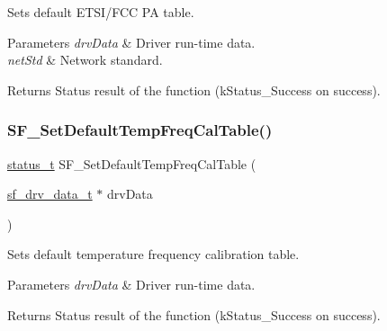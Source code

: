 Sets default E\+T\+S\+I/\+F\+CC PA table. 


\begin{DoxyParams}{Parameters}
{\em drv\+Data} & Driver run-\/time data. \\
\hline
{\em net\+Std} & Network standard.\\
\hline
\end{DoxyParams}
\begin{DoxyReturn}{Returns}
Status result of the function (k\+Status\+\_\+\+Success on success). 
\end{DoxyReturn}
\mbox{\label{group__sf__functions__group_gac8894d84b5416dd2c400507acd3553a1}} 
\subsubsection{\texorpdfstring{SF\_SetDefaultTempFreqCalTable()}{SF\_SetDefaultTempFreqCalTable()}}
{\footnotesize\ttfamily \mbox{\hyperlink{group__ksdk__common_gaaabdaf7ee58ca7269bd4bf24efcde092}{status\+\_\+t}} S\+F\+\_\+\+Set\+Default\+Temp\+Freq\+Cal\+Table (\begin{DoxyParamCaption}\item[{\mbox{\hyperlink{structsf__drv__data__t}{sf\+\_\+drv\+\_\+data\+\_\+t}} $\ast$}]{drv\+Data }\end{DoxyParamCaption})}



Sets default temperature frequency calibration table. 


\begin{DoxyParams}{Parameters}
{\em drv\+Data} & Driver run-\/time data.\\
\hline
\end{DoxyParams}
\begin{DoxyReturn}{Returns}
Status result of the function (k\+Status\+\_\+\+Success on success). 
\end{DoxyReturn}
\mbox{\label{group__sf__functions__group_ga74dd3f84beaf121c2004bb457cdc88be}} 
